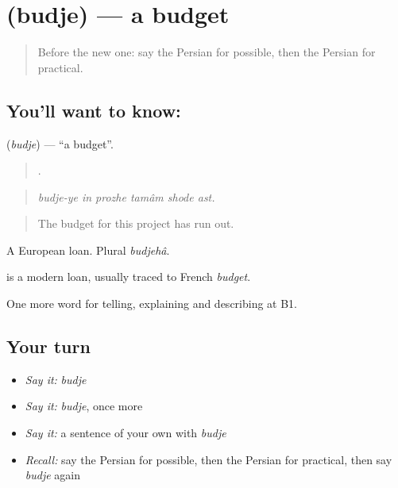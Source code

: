 \section[\texorpdfstring{\fa{بودجه} (budje)}{بودجه (budje)}]{ (budje) — a budget}

\label{lesson:FA-C398-budje}



\begin{quote}
Before the new one: say the Persian for possible, then the Persian for practical.
\end{quote}

\subsection*{You'll want to know: }
\textbf{} (\emph{budje}) — \textquotedblleft{}a budget\textquotedblright{}.

\begin{quote}
     .
\end{quote}

\begin{quote}
\emph{budje-ye in prozhe tamâm shode ast.}
\end{quote}

\begin{quote}
The budget for this project has run out.
\end{quote}

A European loan. Plural \emph{budjehâ}.

\begin{cousinweb}
\textbf{} is a modern loan, usually traced to French \emph{budget}.
\end{cousinweb}

\begin{grammarlens}[title={What you've built}]
One more word for telling, explaining and describing at B1.
\end{grammarlens}

\subsection*{Your turn}
\begin{itemize}
\raggedright
  \item \emph{Say it:} \emph{budje}
  \item \emph{Say it:} \emph{budje}, once more
  \item \emph{Say it:} a sentence of your own with \emph{budje}
  \item \emph{Recall:} say the Persian for possible, then the Persian for practical, then say \emph{budje} again
\end{itemize}

